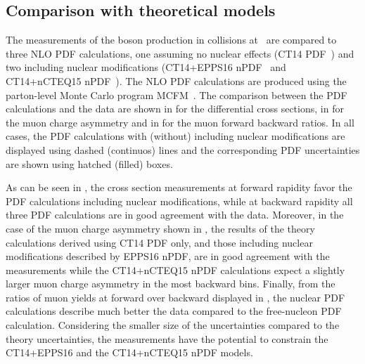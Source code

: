 \subsection{Comparison with theoretical models} \label{sec:WBoson_Results_ComparisonWithTheory}


The measurements of the \W boson production in \pPb collisions at ~\TeV are compared to three NLO PDF calculations, one assuming no nuclear effects (CT14 PDF~\cite{CT14}) and two including nuclear modifications (CT14+EPPS16 nPDF~\cite{EPPS16} and CT14+nCTEQ15 nPDF~\cite{nCTEQ15}). The NLO PDF calculations are produced using the parton-level Monte Carlo program MCFM~\cite{MCFM}. The comparison between the PDF calculations and the data are shown in  for the \W differential cross sections, in  for the muon charge asymmetry and in  for the muon forward backward ratios. In all cases, the PDF calculations with (without) including nuclear modifications are displayed using dashed (continuos) lines and the corresponding PDF uncertainties are shown using hatched (filled) boxes.

As can be seen in , the \W cross section measurements at forward rapidity favor the PDF calculations including nuclear modifications, while at backward rapidity all three PDF calculations are in good agreement with the data. Moreover, in the case of the muon charge asymmetry shown in , the results of the theory calculations derived using CT14 PDF only, and those including nuclear modifications described by EPPS16 nPDF, are in good agreement with the measurements while the CT14+nCTEQ15 nPDF calculations expect a slightly larger muon charge asymmetry in the most backward \etaCM bins. Finally, from the ratios of muon yields at forward over backward \etaCM displayed in , the nuclear PDF calculations describe much better the data compared to the free-nucleon PDF calculation. Considering the smaller size of the uncertainties compared to the theory uncertainties, the measurements have the potential to constrain the CT14+EPPS16 and the CT14+nCTEQ15 nPDF models.


